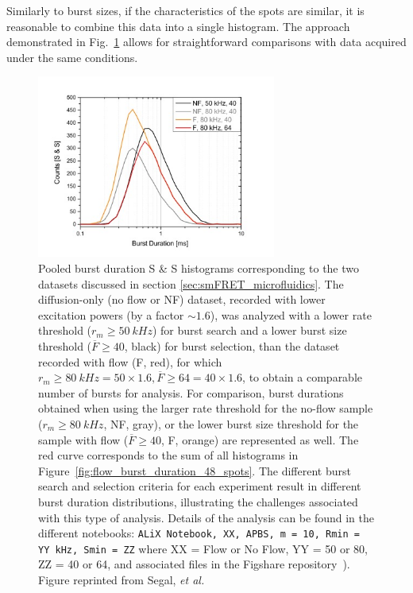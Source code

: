 Similarly to burst sizes, if the characteristics of the spots are similar, it is reasonable to combine this data into a single histogram. 
The approach demonstrated in Fig.~\ref{fig:pooled_burst_duration} allows for straightforward comparisons with data acquired under the same conditions.

\begin{figure}
\centering\includegraphics[width=0.7\textwidth]{chapters/figures/pooled_burst_duration.jpg}
\caption{\label{fig:pooled_burst_duration}
Pooled burst duration S \& S histograms corresponding to the two datasets discussed
in section \ref{sec:smFRET_microfluidics}. 
The diffusion-only (no flow or NF) dataset, recorded with lower excitation powers (by a factor $\sim1.6$), was analyzed with a lower rate threshold ($r_m \geq 50~kHz$) for burst search and a lower burst size threshold ($\overline{F} \geq 40$, black) for burst selection, than the dataset recorded with flow (F, red), for which $r_m \geq 80~kHz = 50 \times 1.6, \overline{F} \geq 64 = 40 \times 1.6$, to obtain a comparable number of bursts for analysis.
For comparison, burst durations obtained when using the larger rate threshold for the no-flow sample  ($r_m \geq 80~kHz$, NF, gray), or the lower burst size threshold for the sample with flow ($\overline{F} \geq 40$, F, orange) are represented as well. 
The red curve corresponds to the sum of all histograms in Figure~\ref{fig:flow_burst_duration_48_spots}.
The different burst search and selection criteria for each experiment result in different burst duration distributions, illustrating the challenges associated with this type of analysis.
Details of the analysis can be found in the different notebooks: \texttt{ALiX Notebook, XX, \ac{APBS}, m = 10, Rmin = YY kHz, Smin = ZZ} where XX = Flow or No Flow, YY = 50 or 80, ZZ = 40 or 64, and associated files in the Figshare repository~\cite{figshare_repo_2019}).
Figure reprinted from Segal, \textit{et al.}~\cite{segal_methods_2019}
}
\end{figure}


